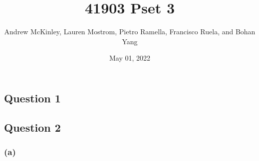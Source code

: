 \documentclass[
]{article}
\title{41903 Pset 3}
\author{Andrew McKinley, Lauren Mostrom, Pietro Ramella, Francisco
Ruela, and Bohan Yang}
\date{May 01, 2022}
\begin{document}
\maketitle

\hypertarget{question-1}{%
\subsection{Question 1}\label{question-1}}

\newpage

\hypertarget{question-2}{%
\subsection{Question 2}\label{question-2}}

\hypertarget{a}{%
\subsubsection{(a)}\label{a}}
\end{document}
